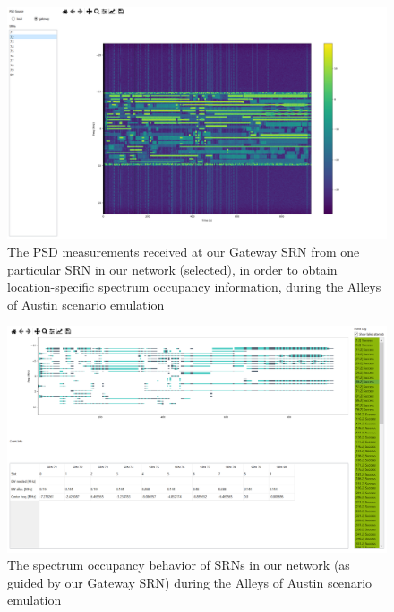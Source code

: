 \begin{figure} [htb]
    \centerline{
    \includegraphics[width = 1.0\textwidth]{Alleys_PSD.PNG}}
    \caption{The PSD measurements received at our Gateway SRN from one particular SRN in our network (selected), in order to obtain location-specific spectrum occupancy information, during the Alleys of Austin scenario emulation}
    \label{fig:B.12}
\end{figure}
\begin{figure} [htb]
    \centerline{
    \includegraphics[width = 1.0\textwidth]{Alleys_Channel_Alloc.PNG}}
    \caption{The spectrum occupancy behavior of SRNs in our network (as guided by our Gateway SRN) during the Alleys of Austin scenario emulation}
    \label{fig:B.13}
\end{figure}
